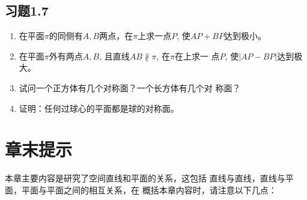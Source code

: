 \begin{solution}
    
\end{solution}
\begin{example}
    
\end{example}

\begin{solution}
    
\end{solution}
\begin{example}
    
\end{example}


\begin{solution}
    
\end{solution}
\begin{example}
    
\end{example}

\begin{example}
    
\end{example}
\begin{example}
    
\end{example}





\subsection*{习题1.7}
\begin{enumerate}
    \item 在平面$\pi$的同侧有$A,B$两点，在$\pi$上求一点$P$, 使$AP+
    BP$达到极小。
    \item 在平面$\pi$外有两点$A,B$, 且直线$AB\nparallel \pi$, 在$\pi$在上求一
    点$P$, 使$|AP-BP|$达到极大。
    \item 试问一个正方体有几个对称面？一个长方体有几个对
    称面？
    \item 证明：任何过球心的平面都是球的对称面。
\end{enumerate}

\section{章末提示}

本章主要内容是研究了空间直线和平面的关系，这包括
直线与直线，直线与平面，平面与平面之间的相互关系，在
概括本章内容时，请注意以下几点：

